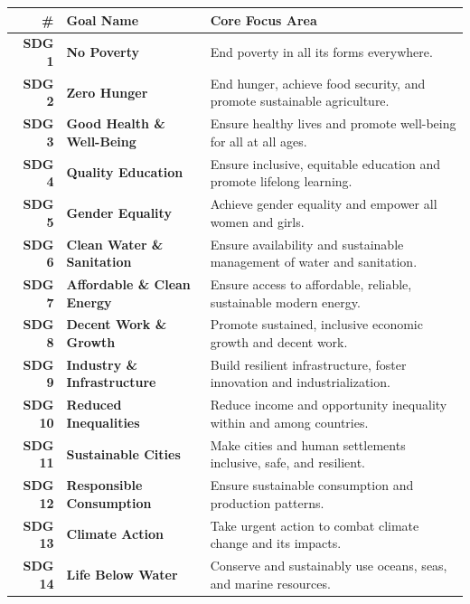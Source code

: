 \begin{table}[htbp]
    \centering
    \small
    \renewcommand{\arraystretch}{1.2}
    \begin{tabularx}{\textwidth}{rlX}
        \toprule
        \textbf{\#} & \textbf{Goal Name} & \textbf{Core Focus Area} \\
        \midrule
        \textbf{SDG 1} & \textbf{No Poverty} & End poverty in all its forms everywhere. \\
        \textbf{SDG 2} & \textbf{Zero Hunger} & End hunger, achieve food security, and promote sustainable agriculture. \\
        \textbf{SDG 3} & \textbf{Good Health \& Well-Being} & Ensure healthy lives and promote well-being for all at all ages. \\
        \textbf{SDG 4} & \textbf{Quality Education} & Ensure inclusive, equitable education and promote lifelong learning. \\
        \textbf{SDG 5} & \textbf{Gender Equality} & Achieve gender equality and empower all women and girls. \\
        \textbf{SDG 6} & \textbf{Clean Water \& Sanitation} & Ensure availability and sustainable management of water and sanitation. \\
        \textbf{SDG 7} & \textbf{Affordable \& Clean Energy} & Ensure access to affordable, reliable, sustainable modern energy. \\
        \textbf{SDG 8} & \textbf{Decent Work \& Growth} & Promote sustained, inclusive economic growth and decent work. \\
        \textbf{SDG 9} & \textbf{Industry \& Infrastructure} & Build resilient infrastructure, foster innovation and industrialization. \\
        \textbf{SDG 10} & \textbf{Reduced Inequalities} & Reduce income and opportunity inequality within and among countries. \\
        \textbf{SDG 11} & \textbf{Sustainable Cities} & Make cities and human settlements inclusive, safe, and resilient. \\
        \textbf{SDG 12} & \textbf{Responsible Consumption} & Ensure sustainable consumption and production patterns. \\
        \textbf{SDG 13} & \textbf{Climate Action} & Take urgent action to combat climate change and its impacts. \\
        \textbf{SDG 14} & \textbf{Life Below Water} & Conserve and sustainably use oceans, seas, and marine resources. \\

\end{tabularx}
\end{table}
